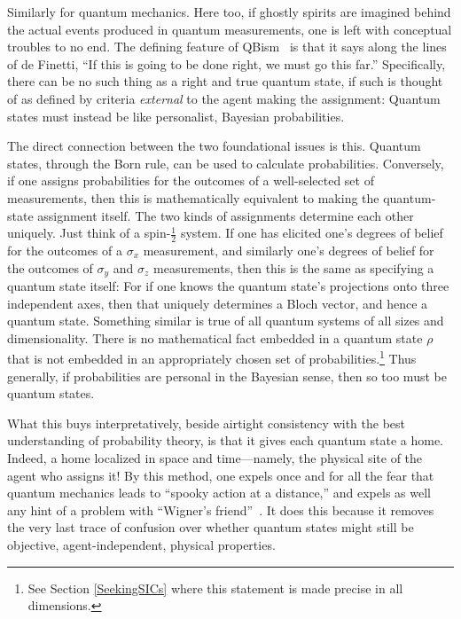 \documentclass[aps,pra,superscriptaddress,10pt,tightenlines,twocolumn,nofootinbib]{revtex4}
\begin{document}
Similarly for quantum mechanics.  Here too, if ghostly spirits are imagined behind the actual events produced in quantum measurements, one is left with conceptual troubles to no end.  The defining feature of QBism~\cite{Caves02,Fuchs02,Fuchs04,Caves07,RMP,Fuchs10,Mermin13,Fuchs10b,AJP,Mermin14,stacey-vonneumann,Baeyer16} is that it says along the lines of de Finetti, ``If this is going to be done right, we must go this far.''  Specifically, there can be no such thing as a right and true quantum state, if such is thought of as defined by criteria {\it external\/} to the agent making the assignment:  Quantum states must instead be like personalist, Bayesian probabilities.

The direct connection between the two foundational issues is this.  Quantum states, through the Born rule, can be used to calculate probabilities.  Conversely, if one assigns probabilities for the outcomes of a well-selected set of measurements, then this is mathematically equivalent to making the quantum-state assignment itself.  The two kinds of assignments determine each other uniquely.  Just think of a spin-$\frac{1}{2}$ system.  If one has elicited one's degrees of belief for the outcomes of a $\sigma_x$ measurement, and similarly one's degrees of belief for the outcomes of $\sigma_y$ and $\sigma_z$ measurements, then this is the same as specifying a quantum state itself:  For if one knows the quantum state's projections onto three independent axes, then that uniquely determines a Bloch vector, and hence a quantum state.  Something similar is true of all quantum systems of all sizes and dimensionality.  There is no mathematical fact embedded in a quantum state $\rho$ that is not embedded in an appropriately chosen set of probabilities.\footnote{See Section \ref{SeekingSICs} where this statement is made precise in all dimensions.}  Thus generally, if probabilities are personal in the Bayesian sense, then so too must be quantum states.

What this buys interpretatively, beside airtight consistency with the best understanding of probability theory, is that it gives each quantum state a home.  Indeed, a home localized in space and time---namely, the physical site of the agent who assigns it!  By this method, one expels once and for all the fear that quantum mechanics leads to ``spooky action at a distance,'' and expels as well any hint of a problem with ``Wigner's friend''~\cite{Wigner71}.  It does this because it removes the very last trace of confusion over whether quantum states might still be objective, agent-independent, physical properties.
\end{document}
